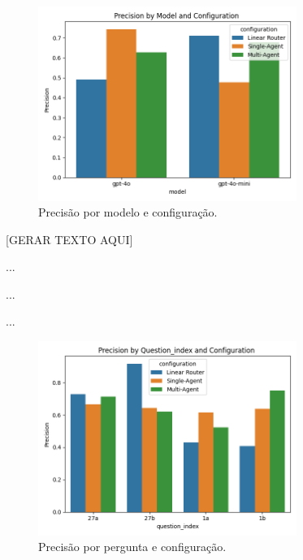                 \begin{figure}[h!]
                    \centering              
                    \includegraphics[width=0.75\textwidth]{images_part_2/model_precision_model_configuration.png}
                    \caption{Precisão por modelo e configuração.}
                    \label{fig:model_precision_model_configuration}
                \end{figure}
                
                [GERAR TEXTO AQUI]

                ...

                ...

                ...

                \begin{figure}[h!]
                    \centering              
                    \includegraphics[width=0.75\textwidth]{images_part_2/question_precision_question_index_configuration.png}
                    \caption{Precisão por pergunta e configuração.}
                    \label{fig:question_precision_question_index_configuration}
                \end{figure}    

